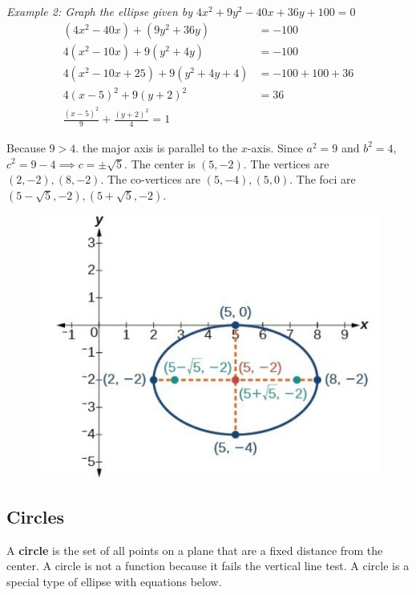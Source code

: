         \noindent \color{blue} \textit{Example 2: Graph the ellipse given by
        $4x^2+9y^2-40x+36y+100=0$} \color{black}  \\

        \begin{align*}
            (4x^2-40x)+(9y^2+36y) &= -100 \\
            4(x^2-10x) + 9(y^2+4y) &= -100 \\
            4(x^2-10x+25)+9(y^2+4y+4) &= -100 + 100 +36 \\
            4(x-5)^2+9(y+2)^2 &= 36 \\
            \frac{(x-5)^2}{9}+\frac{(y+2)^2}{4}=1
        \end{align*}

        \noindent Because $9>4$. the major axis is parallel to the $x$-axis. Since $a^2=9$ and
        $b^2=4$, $c^2=9-4\implies c=\pm \sqrt{5}$. The center is $(5, -2)$. The vertices are
        $(2,-2),(8,-2)$. The co-vertices are $(5,-4),(5,0)$. The foci are $(5-\sqrt{5},-2),
        (5+\sqrt{5},-2)$. \\

        \begin{figure} [hbt!]
            \centering
            \includegraphics [scale=0.5] {Resources/Unit10Conics/ellipse3.PNG}
        \end{figure}



    \subsection{Circles}
        A \textbf{circle} is the set of all points on a plane that are a fixed distance from the
        center. A circle is not a function because it fails the vertical line test. A circle is a
        special type of ellipse with equations below. \\

